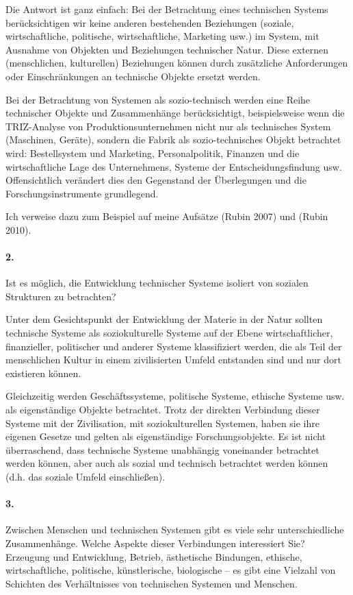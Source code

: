 \documentclass[11pt,a4paper]{article}
\begin{document}
Die Antwort ist ganz einfach: Bei der Betrachtung eines technischen Systems
berücksichtigen wir keine anderen bestehenden Beziehungen (soziale,
wirtschaftliche, politische, wirtschaftliche, Marketing usw.) im System, mit
Ausnahme von Objekten und Beziehungen technischer Natur. Diese externen
(menschlichen, kulturellen) Beziehungen können durch zusätzliche Anforderungen
oder Einschränkungen an technische Objekte ersetzt werden.

Bei der Betrachtung von Systemen als sozio-technisch werden eine Reihe
technischer Objekte und Zusammenhänge berücksichtigt, beispielsweise wenn die
TRIZ-Analyse von Produktionsunternehmen nicht nur als technisches System
(Maschinen, Geräte), sondern die Fabrik als sozio-technisches Objekt
betrachtet wird: Bestellsystem und Marketing, Personalpolitik, Finanzen und
die wirtschaftliche Lage des Unternehmens, Systeme der Entscheidungsfindung
usw. Offensichtlich verändert dies den Gegenstand der Überlegungen und die
Forschungsinstrumente grundlegend.

Ich verweise dazu zum Beispiel auf meine Aufsätze (Rubin 2007) und (Rubin
2010).

\paragraph{2.}
Ist es möglich, die Entwicklung technischer Systeme isoliert von sozialen
Strukturen zu betrachten?

Unter dem Gesichtspunkt der Entwicklung der Materie in der Natur sollten
technische Systeme als soziokulturelle Systeme auf der Ebene wirtschaftlicher,
finanzieller, politischer und anderer Systeme klassifiziert werden, die als
Teil der menschlichen Kultur in einem zivilisierten Umfeld entstanden sind
und nur dort existieren können.

Gleichzeitig werden Geschäftssysteme, politische Systeme, ethische Systeme
usw. als eigen\-ständige Objekte betrachtet. Trotz der direkten Verbindung
dieser Systeme mit der Zivilisation, mit soziokulturellen Systemen, haben sie
ihre eigenen Gesetze und gelten als eigenständige Forschungsobjekte. Es ist
nicht überraschend, dass technische Systeme unabhängig voneinander betrachtet
werden können, aber auch als sozial und technisch betrachtet werden können
(d.h. das soziale Umfeld einschließen).

\paragraph{3.}
Zwischen Menschen und technischen Systemen gibt es viele sehr unterschiedliche
Zusammenhänge. Welche Aspekte dieser Verbindungen interessiert Sie?  Erzeugung
und Entwicklung, Betrieb, ästhetische Bindungen, ethische, wirtschaftliche,
politische, künstlerische, biologische -- es gibt eine Vielzahl von Schichten
des Verhältnisses von technischen Systemen und Menschen.
\end{document}
